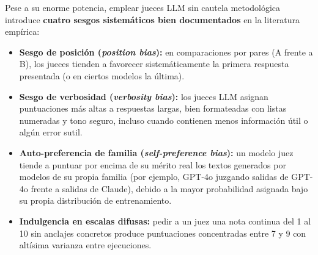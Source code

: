 Pese a su enorme potencia, emplear jueces LLM sin cautela metodológica introduce \textbf{cuatro sesgos sistemáticos bien documentados} en la literatura empírica:

\begin{itemize}
  \item \textbf{Sesgo de posición (\textit{position bias}):} en comparaciones por pares (A frente a B), los jueces tienden a favorecer sistemáticamente la primera respuesta presentada (o en ciertos modelos la última).
  \item \textbf{Sesgo de verbosidad (\textit{verbosity bias}):} los jueces LLM asignan puntuaciones más altas a respuestas largas, bien formateadas con listas numeradas y tono seguro, incluso cuando contienen menos información útil o algún error sutil.
  \item \textbf{Auto-preferencia de familia (\textit{self-preference bias}):} un modelo juez tiende a puntuar por encima de su mérito real los textos generados por modelos de su propia familia (por ejemplo, GPT-4o juzgando salidas de GPT-4o frente a salidas de Claude), debido a la mayor probabilidad asignada bajo su propia distribución de entrenamiento.
  \item \textbf{Indulgencia en escalas difusas:} pedir a un juez una nota continua del 1 al 10 sin anclajes concretos produce puntuaciones concentradas entre 7 y 9 con altísima varianza entre ejecuciones.
\end{itemize}

